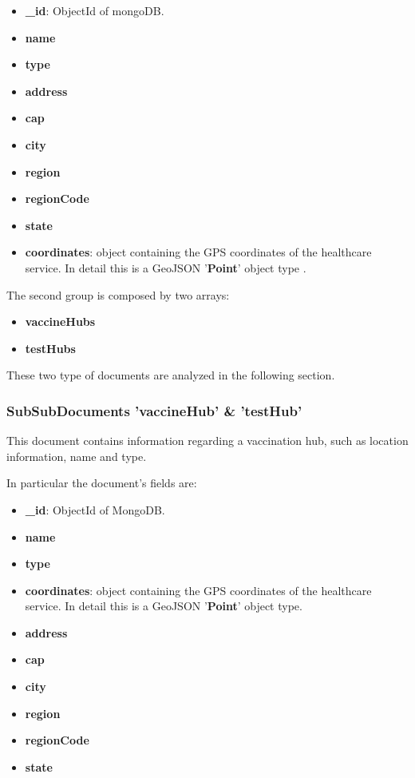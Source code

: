 \documentclass{article}[IEEEtran]
\begin{document}
        \begin{itemize}
            \item \textbf{\_id}: ObjectId of mongoDB.
            \item \textbf{name}
            \item \textbf{type}
            \item \textbf{address}
            \item \textbf{cap}
            \item \textbf{city}
            \item \textbf{region}
            \item \textbf{regionCode}
            \item \textbf{state}
            \item \textbf{coordinates}: object containing the GPS coordinates of the healthcare service. In detail this is a GeoJSON '\textbf{Point}' object type\cite{mongodbGeoJson} .
        \end{itemize}
        
The second group is composed by two arrays:
\begin{itemize}
    \item \textbf{vaccineHubs}
    \item \textbf{testHubs}
\end{itemize}

These two type of documents are analyzed in the following section.

\subsubsection{SubSubDocuments 'vaccineHub' \& 'testHub'}

This document contains information regarding a vaccination hub, such as location information, name and type.

In particular the document's fields are:

\begin{itemize}
    \item \textbf{\_id}: ObjectId of MongoDB.
    \item \textbf{name}
    \item \textbf{type}
    \item \textbf{coordinates}: object containing the GPS coordinates of the healthcare service. In detail this is a GeoJSON '\textbf{Point}' object type.
    \item \textbf{address}
    \item \textbf{cap}
    \item \textbf{city}
    \item \textbf{region}
    \item \textbf{regionCode}
    \item \textbf{state}
\end{itemize}
\end{document}

